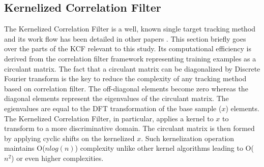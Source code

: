 \documentclass{bmvc2k}
\begin{document}
\subsection{Kernelized Correlation Filter} \label{sec:kcf}
The Kernelized Correlation Filter is a well, known single target
tracking method and its work flow has been detailed in other papers
\cite{henriques2012exploiting,henriques2015high}. This section briefly
goes over the parts of the KCF relevant to this study. Its
computational efficiency is derived from the correlation filter
framework representing training examples as a circulant matrix. The
fact that a circulant matrix can be diagonalized by Discrete Fourier
transform is the key to reduce the complexity of any tracking method
based on correlation filter. The off-diagonal elements become zero
whereas the diagonal elements represent the eigenvalues of the
circulant matrix. The egienvalues are equal to the DFT transformation
of the base sample ($x$) elements. The Kernelized Correlation Filter,
in particular, applies a kernel to $x$ to transform to a more
discriminative domain. The circulant matrix is then formed by applying
cyclic shifts on the kernelized $x$. Such kernelization operation maintains 
O($nlog(n)$) complexity unlike other kernel algorithms leading to O($n^{2}$) or even higher 
complexities.
\end{document}
